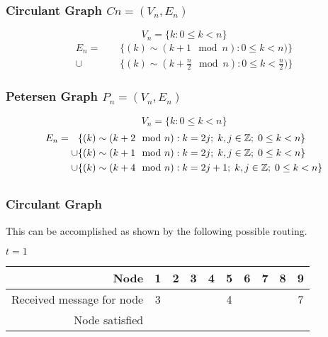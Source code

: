 \section{}
\subsection{}
\subsubsection*{Circulant Graph $Cn=(V_n,E_n)$}
\[V_n=\{k: 0\leq k < n\}\]
\begin{align*}
    E_n =\phantom{\cup}&\{(k)\sim(k+1 \mod n): 0 \leq k < n)\}\\
    \cup&\{(k)\sim(k+\frac{n}{2} \mod n): 0 \leq k < \frac{n}{2})\}
\end{align*}

\subsubsection*{Petersen Graph $P_n=(V_n,E_n)$}
\[ V_n = \{k: 0\leq k < n\}\]
\begin{align*}
    E_n =\phantom{\cup}&\{(k)\sim (k+2 \mod n): k=2j ;\; k,j \in  \mathbb{Z} ;\; 0\leq k<n\}\\
    \cup&\{(k)\sim(k+1 \mod n): k=2j;\; k,j \in \mathbb{Z} ;\;  0\leq k<n\}\\ 
    \cup&\{(k)\sim (k+4 \mod n): k=2j+1;\; k,j \in \mathbb{Z} ;\;  0\leq k<n\} 
\end{align*}

\subsection{}
\subsubsection*{Circulant Graph}
This can be accomplished as shown by the following possible routing.

$t=1$
\begin{center}
\begin{tabular}{r|ccccccccc}
 Node  & 1 & 2 & 3 & 4 & 5 & 6 & 7 & 8 & 9\\
 \hline
 Received message for node & 3 &  &  &  & 4 &  &  &  & 7 \\
 Node satisfied   &  &  &  &  &  &  &  &  & 
\end{tabular}
\end{center}

